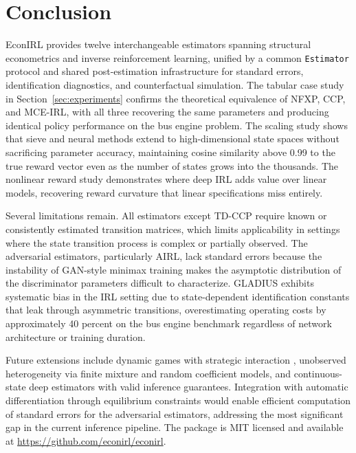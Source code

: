 \section{Conclusion}
\label{sec:conclusion}

EconIRL provides twelve interchangeable estimators spanning structural econometrics and inverse reinforcement learning, unified by a common \texttt{Estimator} protocol and shared post-estimation infrastructure for standard errors, identification diagnostics, and counterfactual simulation. The tabular case study in Section~\ref{sec:experiments} confirms the theoretical equivalence of NFXP, CCP, and MCE-IRL, with all three recovering the same parameters and producing identical policy performance on the \citet{rust1987} bus engine problem. The scaling study shows that sieve and neural methods extend to high-dimensional state spaces without sacrificing parameter accuracy, maintaining cosine similarity above 0.99 to the true reward vector even as the number of states grows into the thousands. The nonlinear reward study demonstrates where deep IRL adds value over linear models, recovering reward curvature that linear specifications miss entirely.

Several limitations remain. All estimators except TD-CCP require known or consistently estimated transition matrices, which limits applicability in settings where the state transition process is complex or partially observed. The adversarial estimators, particularly AIRL, lack standard errors because the instability of GAN-style minimax training makes the asymptotic distribution of the discriminator parameters difficult to characterize. GLADIUS exhibits systematic bias in the IRL setting due to state-dependent identification constants that leak through asymmetric transitions, overestimating operating costs by approximately 40 percent on the bus engine benchmark regardless of network architecture or training duration.

Future extensions include dynamic games with strategic interaction \citep{aguirregabiriaMira2002}, unobserved heterogeneity via finite mixture and random coefficient models, and continuous-state deep estimators with valid inference guarantees. Integration with automatic differentiation through equilibrium constraints would enable efficient computation of standard errors for the adversarial estimators, addressing the most significant gap in the current inference pipeline. The package is MIT licensed and available at \url{https://github.com/econirl/econirl}.
